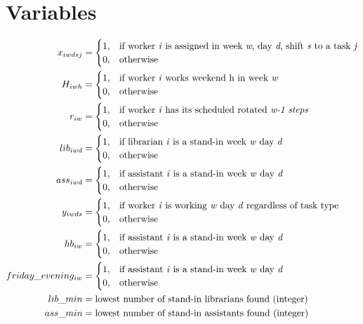 \documentclass[a4paper, 10pt, twoside, openright]{book}
\begin{document}
\section{Variables} \label{variabs}
\begin{align}
    x_{iwdsj}&=
    \begin{cases}
      1, & \text{if worker \textit{i} is assigned in week \textit{w}, day \textit{d}, shift \textit{s} to a task \textit{j}}\\
      0, & \text{otherwise}
    \end{cases}
    \\
    H_{iwh}&=
    \begin{cases}
      1, & \text{if worker \textit{i} works weekend h in week \textit{w}}\\
      0, & \text{otherwise}
    \end{cases}
	\\
	r_{iw}&=
	\begin{cases}
		1, & \text{if worker \textit{i} has its scheduled rotated \textit{w-1 steps}}\\
		0, & \text{otherwise}
	\end{cases}
	\\
	lib_{iwd}&=
	\begin{cases}
	  1, & \text{if librarian \textit{i} is a stand-in week \textit{w} day \textit{d}} \\
	  0, & \text{otherwise}
	\end{cases}
	\\
	ass_{iwd}&=
	\begin{cases}
 		1, & \text{if assistant \textit{i} is a stand-in week \textit{w} day \textit{d}} \\
 		0, & \text{otherwise}
	\end{cases}
	\\
	y_{iwds}&=
	\begin{cases}
 		1, & \text{if worker \textit{i} is working \textit{w} day \textit{d} regardless of task type} \\
 		0, & \text{otherwise}
	\end{cases}
	\\
	hb_{iw}&=
	\begin{cases}
 		1, & \text{if assistant \textit{i} is a stand-in week \textit{w} day \textit{d}} \\
 		0, & \text{otherwise}
	\end{cases}
	\\
	friday\_evening_{iw}&=
	\begin{cases}
 		1, & \text{if assistant \textit{i} is a stand-in week \textit{w} day \textit{d}} \\
 		0, & \text{otherwise}
	\end{cases}	
	\\
	lib\_min&= \text{lowest number of stand-in librarians found (integer)} \\
	ass\_min&= \text{lowest number of stand-in assistants found (integer)}
\end{align}
\newpage
\end{document}
